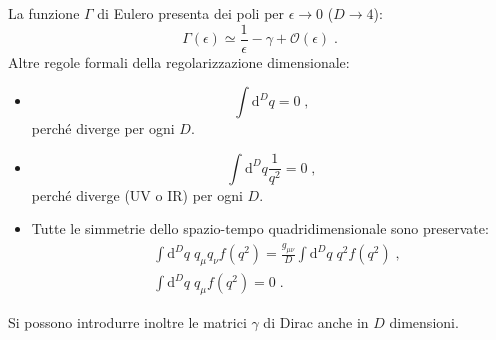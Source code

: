 \documentclass[12pt,a4paper]{article}
\theoremstyle{definition}
\numberwithin{equation}{section}
\newcommand{\diff}[1][]{\mathrm{d}#1}
\begin{document}
La funzione $\Gamma$ di Eulero presenta dei poli per $\epsilon\to 0$ ($D\to 4$):
\begin{equation}
\Gamma(\epsilon)\simeq \frac{1}{\epsilon}-\gamma+\mathcal{O}(\epsilon)\;.
\end{equation}
Altre regole formali della regolarizzazione dimensionale:
\begin{itemize}
\item \begin{equation}
\int \diff^D{q}=0\;,
\end{equation}
perché diverge per ogni $D$.
\item \begin{equation}
\int\diff^D{q}\frac{1}{q^2}=0\;,
\end{equation}
perché diverge (UV o IR) per ogni $D$.
\item Tutte le simmetrie dello spazio-tempo quadridimensionale sono preservate:
\begin{align}
&\int\diff^D{q}\;q_{\mu}q_{\nu}f(q^2)=\frac{g_{\mu\nu}}{D}\int\diff^D{q}\;q^2f(q^2)\;, \\
&\int\diff^D{q}\;q_{\mu}f(q^2)=0\;.
\end{align}
\end{itemize}
Si possono introdurre inoltre le matrici $\gamma$ di Dirac anche in $D$ dimensioni.
\end{document}

